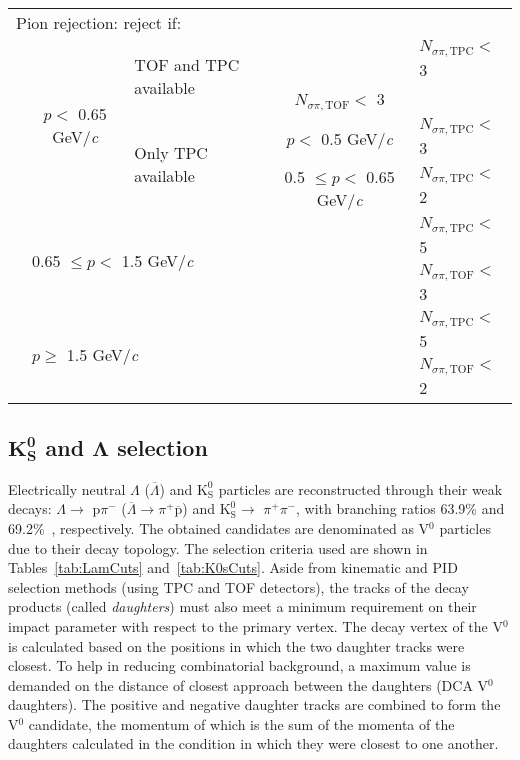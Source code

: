 \documentclass[ALICE,manyauthors]{cernphprep}
\newcommand{\Lam}{$\Lambda$\xspace}
\newcommand{\ALam}{$\overline{\Lambda}$\xspace}
\newcommand{\LamALam}{$\Lambda$ ($\overline{\Lambda}$)\xspace}
\newcommand{\Kpm}{$\mathrm{K^{\pm}}$\xspace}
\newcommand{\Ks}{$\mathrm{K^{0}_{S}}$\xspace}
\newcommand{\Vz}{V$^{0}$\xspace}
\begin{document}
\begin{table}[htbp]
\begin{tabular}{lcc|c|l}
   \multicolumn{5}{l}{Pion rejection:  reject if:} \\
   \cline{2-5}
   \multirow{4}{*}{} & \multirow{4}{*}{$p <$ 0.65 GeV/\textit{c}} & \multicolumn{1}{l}{\multirow{2}{*}{TOF and TPC available}} & \multicolumn{1}{c|}{} & $N_{\sigma \pi,\mathrm{TPC}} <$ 3 \\
   \multicolumn{4}{c|}{} & $N_{\sigma \pi,\mathrm{TOF}} <$ 3 \\
   \cline{3-5}
   \multicolumn{2}{c}{} & \multicolumn{1}{l|}{\multirow{2}{*}{Only TPC available}} & $p <$ 0.5 GeV/\textit{c} & $N_{\sigma \pi,\mathrm{TPC}} <$ 3 \\
   \cline{4-5}
   \multicolumn{3}{c|}{} & 0.5 $\leq p <$ 0.65 GeV/\textit{c} & $N_{\sigma \pi,\mathrm{TPC}} <$ 2 \\
   \cline{2-5}
    & \multicolumn{3}{l|}{\multirow{2}{*}{0.65 $\leq p <$ 1.5 GeV/\textit{c}}} & $N_{\sigma \pi,\mathrm{TPC}} <$ 5 \\
    \multicolumn{4}{c|}{} & $N_{\sigma \pi,\mathrm{TOF}} <$ 3 \\
   \cline{2-5}
    & \multicolumn{3}{l|}{\multirow{2}{*}{$p \geq$ 1.5 GeV/\textit{c}}} & $N_{\sigma \pi,\mathrm{TPC}} <$ 5 \\
    \multicolumn{4}{c|}{} & $N_{\sigma \pi,\mathrm{TOF}} <$ 2 \\
   \hline
  \end{tabular}
 \label{tab:KchCuts} 
\end{table}


\subsection{$\mathbf{K^{0}_{S}}$ and $\boldsymbol{\Lambda}$ selection}
\label{sec:V0Selection}

Electrically neutral \LamALam and \Ks particles are reconstructed through their weak decays: \Lam $\rightarrow$ p$\pi^{-}$ (\ALam $\rightarrow \pi^{+}\overline{\mathrm{p}}$) and \Ks $\rightarrow$ $\pi^{+}\pi^{-}$, with branching ratios 63.9\% and 69.2\%~\cite{PhysRevD.98.030001}, respectively.
The obtained candidates are denominated as \Vz particles due to their decay topology.
The selection criteria used are shown in Tables~\ref{tab:LamCuts} and~\ref{tab:K0sCuts}.
Aside from kinematic and PID selection methods (using TPC and TOF detectors), the tracks of the decay products (called \textit{daughters}) must also meet a minimum requirement on their impact parameter with respect to the primary vertex.  
The decay vertex of the \Vz is calculated based on the positions in which the two daughter tracks were closest.
To help in reducing combinatorial background, a maximum value is demanded on the distance of closest approach between the daughters (DCA \Vz daughters).
The positive and negative daughter tracks are combined to form the \Vz candidate, the momentum of which is the sum of the momenta of the daughters calculated in the condition in which they were closest to one another.
\end{document}
